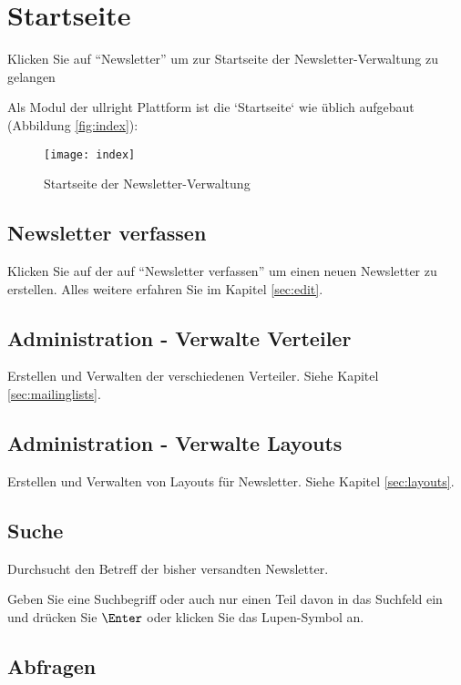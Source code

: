 \documentclass[article, a4paper, oneside, 11pt]{memoir}
\begin{document}
\chapter{Startseite}

Klicken Sie auf "`Newsletter"' um zur Startseite der Newsletter-Verwaltung zu gelangen

Als Modul der ullright Plattform ist die `Startseite` wie üblich aufgebaut (Abbildung \vref{fig:index}):

\begin{figure}[htp]
\centering
\texttt{[image: index]}
\caption{Startseite der Newsletter-Verwaltung}
\label{fig:index}
\end{figure}


\section{Newsletter verfassen}

Klicken Sie auf der auf "`Newsletter verfassen"' um einen neuen Newsletter zu erstellen. Alles weitere erfahren Sie im Kapitel \vref{sec:edit}.

\section{Administration - Verwalte Verteiler}

Erstellen und Verwalten der verschiedenen Verteiler. Siehe Kapitel \vref{sec:mailinglists}. 

\section{Administration - Verwalte Layouts}

Erstellen und Verwalten von Layouts für Newsletter. Siehe Kapitel \vref{sec:layouts}. 


\section{Suche}

Durchsucht den Betreff der bisher versandten Newsletter.

Geben Sie eine Suchbegriff oder auch nur einen Teil davon in das Suchfeld ein und drücken Sie $\Enter$ oder klicken Sie das Lupen-Symbol an.

\section{Abfragen}
\end{document}
